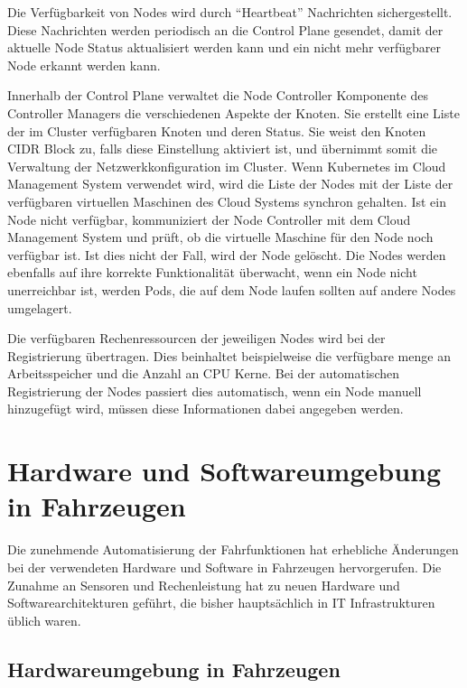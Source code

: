 Die Verfügbarkeit von Nodes wird durch \enquote{Heartbeat} Nachrichten sichergestellt. Diese Nachrichten werden periodisch an die Control Plane gesendet, damit der aktuelle Node Status aktualisiert werden kann und ein nicht mehr verfügbarer Node erkannt werden kann. 

Innerhalb der Control Plane verwaltet die Node Controller Komponente des Controller Managers die verschiedenen Aspekte der Knoten. Sie erstellt eine Liste der im Cluster verfügbaren Knoten und deren Status. Sie weist den Knoten 
CIDR Block zu, falls diese Einstellung aktiviert ist, und übernimmt somit die Verwaltung der Netzwerkkonfiguration im Cluster. Wenn Kubernetes im Cloud Management System verwendet wird, wird die Liste der Nodes mit der Liste der verfügbaren virtuellen Maschinen des Cloud Systems synchron gehalten. Ist ein Node nicht verfügbar, kommuniziert der Node Controller mit dem Cloud Management System und prüft, ob die virtuelle Maschine für den Node noch verfügbar ist. Ist dies nicht der Fall, wird der Node gelöscht. Die Nodes werden ebenfalls auf ihre korrekte Funktionalität überwacht, wenn ein Node nicht unerreichbar ist, werden Pods, die auf dem Node laufen sollten auf andere Nodes umgelagert. 

Die verfügbaren Rechenressourcen der jeweiligen Nodes wird bei der Registrierung übertragen. Dies beinhaltet beispielweise die verfügbare menge an Arbeitsspeicher und die Anzahl an CPU Kerne. Bei der automatischen Registrierung der Nodes passiert dies automatisch, wenn ein Node manuell hinzugefügt wird, müssen diese Informationen dabei angegeben werden. 

\section{Hardware und Softwareumgebung in Fahrzeugen}

Die zunehmende Automatisierung der Fahrfunktionen hat erhebliche Änderungen bei der verwendeten Hardware und Software in Fahrzeugen hervorgerufen. Die Zunahme an Sensoren und Rechenleistung hat zu neuen Hardware und Softwarearchitekturen geführt, die bisher hauptsächlich in IT Infrastrukturen üblich waren. 

\subsection{Hardwareumgebung in Fahrzeugen}

